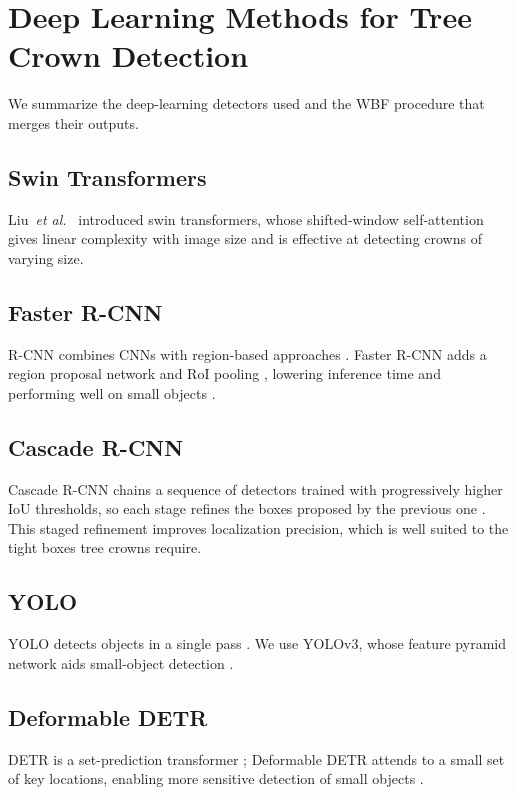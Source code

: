 \documentclass{article}
\begin{document}
\section{Deep Learning Methods for Tree Crown Detection}\label{sec:deep_learning_models}

We summarize the deep-learning detectors used and the WBF procedure that merges their outputs.

\subsection{Swin Transformers}
Liu~\emph{et al.}~\cite{liu2021swin} introduced swin transformers, whose shifted-window self-attention gives linear complexity with image size and is effective at detecting crowns of varying size.

\subsection{Faster R-CNN}
R-CNN combines CNNs with region-based approaches \cite{girshick2014rich}. Faster R-CNN adds a region proposal network and RoI pooling \cite{ren2015faster}, lowering inference time and performing well on small objects \cite{nguyen2020evaluation,liu2021survey}.

\subsection{Cascade R-CNN}
Cascade R-CNN chains a sequence of detectors trained with progressively higher IoU thresholds, so each stage refines the boxes proposed by the previous one \cite{cai2018cascade}. This staged refinement improves localization precision, which is well suited to the tight boxes tree crowns require.

\subsection{YOLO}
YOLO detects objects in a single pass \cite{redmon2016you}. We use YOLOv3, whose feature pyramid network aids small-object detection \cite{redmon2018yolov3, wang2022remote}.

\subsection{Deformable DETR}
DETR is a set-prediction transformer \cite{carion2020end}; Deformable DETR attends to a small set of key locations, enabling more sensitive detection of small objects \cite{zhu2020deformable}.
\end{document}
